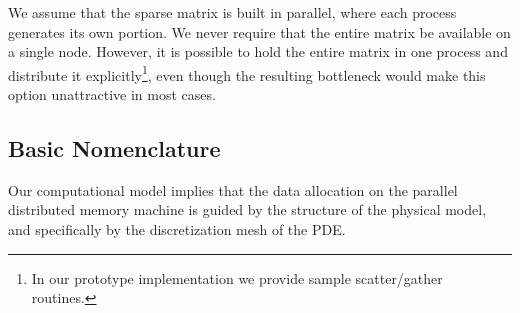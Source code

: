 We assume that the sparse matrix is built in parallel, where each
process generates its own portion. We never require that the entire
matrix be available on a single node. However, it is possible
to hold the entire matrix in one process and distribute it
explicitly\footnote{In our prototype implementation  we provide 
sample scatter/gather routines.}, even though  the resulting 
bottleneck would make this option unattractive in most  cases. 


\subsection{Basic Nomenclature}


Our computational model implies that the data allocation on the
parallel distributed memory machine is guided by the structure of the
physical model, and specifically by the discretization mesh of the
PDE. 

